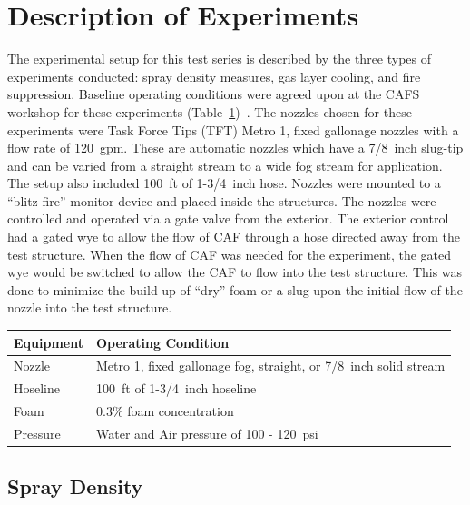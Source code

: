 \documentclass[12pt,oneside]{book}
\begin{document}
\section{Description of Experiments}
\label{sec:desc_experiments}
The experimental setup for this test series is described by the three types of experiments conducted: spray density measures, gas layer cooling, and fire suppression.  Baseline operating conditions were agreed upon at the CAFS workshop for these experiments (Table~\ref{tab:op_condition})~\cite{Grant:2011}. The nozzles chosen for these experiments were Task Force Tips (TFT) Metro 1, fixed gallonage nozzles with a flow rate of 120~gpm. These are automatic nozzles which have a 7/8~inch slug-tip and can be varied from a straight stream to a wide fog stream for application. The setup also included 100~ft of 1-3/4~inch hose. Nozzles were mounted to a ``blitz-fire'' monitor device and placed inside the structures. The nozzles were controlled and operated via a gate valve from the exterior. The exterior control had a gated wye to allow the flow of CAF through a hose directed away from the test structure. When the flow of CAF was needed for the experiment, the gated wye would be switched to allow the CAF to flow into the test structure. This was done to minimize the build-up of ``dry'' foam or a slug upon the initial flow of the nozzle into the test structure.

\begin{table}[!ht]
\centering
{}\label{tab:op_condition}
\begin{tabular}{ll}
\toprule[1.5pt]
Equipment    &   Operating Condition \\
\midrule
Nozzle       & Metro 1, fixed gallonage fog, straight, or 7/8~inch solid stream \\
Hoseline     & 100~ft of 1-3/4~inch hoseline \\
Foam         & 0.3\% foam concentration \\
Pressure     & Water and Air pressure of 100 - 120~psi \\
\bottomrule[1.25pt]
\end{tabular}\par
\end{table}


\subsection{Spray Density}
\label{sec:desc_Spray_Density}
\end{document}
